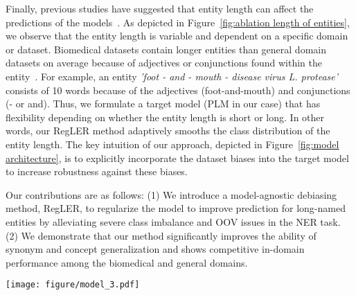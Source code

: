 \documentclass[11pt]{article}
\begin{document}
Finally, previous studies have suggested that entity length can affect the predictions of the models~\cite{fu2020rethinking, hong2020dtranner, wei2020multichannel}.
As depicted in Figure~\ref{fig:ablation length of entities}, we observe that the entity length is variable and dependent on a specific domain or dataset.
Biomedical datasets contain longer entities than general domain datasets on average because of  adjectives or conjunctions found within the entity~\cite{wei2020multichannel, cho2020combinatorial}.
For example, an entity \textit{'foot - and - mouth - disease virus L. protease'} consists of 10 words because of the adjectives (foot-and-mouth) and conjunctions (- or and).
Thus, we formulate a target model (PLM in our case) that has flexibility depending on whether the entity length is short or long.
In other words, our RegLER method adaptively smooths the class distribution of the entity length.
The key intuition of our approach, depicted in Figure~\ref{fig:model architecture}, is to explicitly incorporate the dataset biases into the target model to increase robustness against these biases.

Our contributions are as follows: 
(1) We introduce a model-agnostic debiasing method, RegLER, to regularize the model to improve prediction for long-named entities by alleviating severe class imbalance and OOV issues in the NER task.
(2) We demonstrate that our method significantly improves the ability of synonym and concept generalization and shows competitive in-domain performance among the biomedical and general domains.


\begin{figure*}[t]
 \centering
 \texttt{[image: figure/model\_3.pdf]}
 \caption{The overview of RegLER. (a) PMI reflects a solution of class imbalance, and the subword frequency solves an out-of-vocabulary (OOV) issue. For example, we depict the OOV issue with the word \textit{Latent} that does not appear in the training dataset but occurs in the test dataset. 
 We designed a class prior to reflecting the class imbalance inherent in the NER task. (b) We substitute a bias-only model with PMI statistic.
 For example, the word \textit{disease} is mainly classified with an \textit{I} (or inside) label, but the class distribution focuses on an \textit{O} (or outside) label.
 Our bias-only model reduces the importance of the label \textit{I} by adding the PMI score to the logit value of the target model (). 
 Subsequently, we use temperature scaling \protect\cite{guo2017calibration} to smooth the class distribution of the normalized PMI depending on the entity length. The red line indicates that computing the PMI is only added during the training time.}
 \label{fig:model architecture}
\end{figure*}
\end{document}
